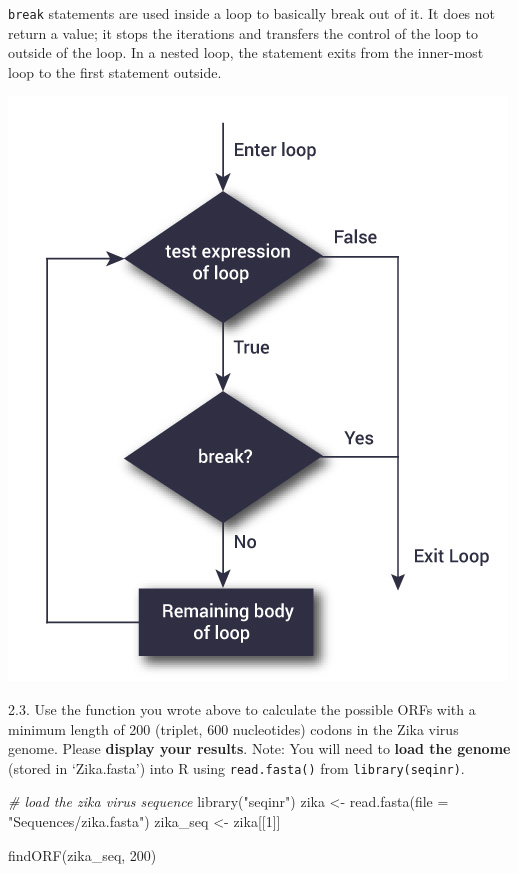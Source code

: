 \documentclass[
]{article}
\newenvironment{Shaded}{\begin{snugshade}}{\end{snugshade}}
\newcommand{\AttributeTok}[1]{\textcolor[rgb]{0.77,0.63,0.00}{#1}}
\newcommand{\CommentTok}[1]{\textcolor[rgb]{0.56,0.35,0.01}{\textit{#1}}}
\newcommand{\DecValTok}[1]{\textcolor[rgb]{0.00,0.00,0.81}{#1}}
\newcommand{\FunctionTok}[1]{\textcolor[rgb]{0.00,0.00,0.00}{#1}}
\newcommand{\NormalTok}[1]{#1}
\newcommand{\OtherTok}[1]{\textcolor[rgb]{0.56,0.35,0.01}{#1}}
\newcommand{\StringTok}[1]{\textcolor[rgb]{0.31,0.60,0.02}{#1}}
\begin{document}
\texttt{break} statements are used inside a loop to basically break out
of it. It does not return a value; it stops the iterations and transfers
the control of the loop to outside of the loop. In a nested loop, the
statement exits from the inner-most loop to the first statement outside.

\includegraphics{./Images/img4.jpg}

2.3. Use the function you wrote above to calculate the possible ORFs
with a minimum length of 200 (triplet, 600 nucleotides) codons in the
Zika virus genome. Please \textbf{display your results}. Note: You will
need to \textbf{load the genome} (stored in `Zika.fasta') into R using
\texttt{read.fasta()} from \texttt{library(seqinr)}. \span

\begin{Shaded}
\begin{Highlighting}[]
\CommentTok{\# load the zika virus sequence}
\FunctionTok{library}\NormalTok{(}\StringTok{"seqinr"}\NormalTok{)}
\NormalTok{zika }\OtherTok{\textless{}{-}} \FunctionTok{read.fasta}\NormalTok{(}\AttributeTok{file =} \StringTok{"Sequences/zika.fasta"}\NormalTok{)}
\NormalTok{zika\_seq }\OtherTok{\textless{}{-}}\NormalTok{ zika[[}\DecValTok{1}\NormalTok{]]}

\FunctionTok{findORF}\NormalTok{(zika\_seq, }\DecValTok{200}\NormalTok{)}
\end{Highlighting}
\end{Shaded}
\end{document}
